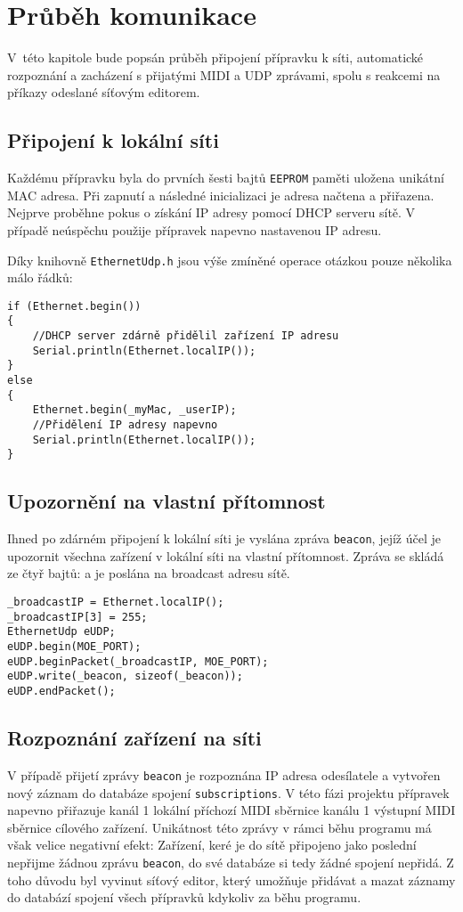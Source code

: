 \chapter{Průběh komunikace}
V~této kapitole bude popsán průběh připojení přípravku k síti, automatické rozpoznání a zacházení s přijatými \acs{MIDI} a \acs{UDP} zprávami, spolu s reakcemi na příkazy odeslané síťovým editorem.

\section{Připojení k lokální síti}
Každému přípravku byla do prvních šesti bajtů \texttt{EEPROM} paměti uložena unikátní MAC adresa. Při zapnutí a následné inicializaci je adresa načtena a přiřazena. Nejprve proběhne pokus o získání IP adresy pomocí DHCP serveru sítě. V případě neúspěchu použije přípravek napevno nastavenou IP adresu. 

Díky knihovně \texttt{EthernetUdp.h} jsou výše zmíněné operace otázkou pouze několika málo řádků:

\begin{lstlisting}
if (Ethernet.begin())
{
    //DHCP server zdárně přidělil zařízení IP adresu
    Serial.println(Ethernet.localIP());
}
else
{
    Ethernet.begin(_myMac, _userIP);
    //Přidělení IP adresy napevno
    Serial.println(Ethernet.localIP());
}
\end{lstlisting}






\section{Upozornění na vlastní přítomnost}
Ihned po zdárném připojení k lokální síti je vyslána zpráva  \texttt{beacon}, jejíž účel je upozornit všechna zařízení v lokální síti na vlastní přítomnost. Zpráva se skládá ze čtyř bajtů:
a je poslána na broadcast adresu sítě.

\begin{lstlisting}
_broadcastIP = Ethernet.localIP();
_broadcastIP[3] = 255;
EthernetUdp eUDP;
eUDP.begin(MOE_PORT);
eUDP.beginPacket(_broadcastIP, MOE_PORT);
eUDP.write(_beacon, sizeof(_beacon));
eUDP.endPacket();
\end{lstlisting}

\section{Rozpoznání zařízení na síti}
V případě přijetí zprávy \texttt{beacon} je rozpoznána IP adresa odesílatele a vytvořen nový záznam do databáze spojení \texttt{sub\-scrip\-tions}. V této fázi projektu přípravek napevno přiřazuje kanál 1  lokální příchozí \acs{MIDI} sběrnice kanálu 1 výstupní \acs{MIDI} sběrnice cílového zařízení. Unikátnost této zprávy v rámci běhu programu má však velice negativní efekt: Zařízení, keré je do sítě připojeno jako poslední nepřijme žádnou zprávu \texttt{beacon}, do své databáze si tedy žádné spojení nepřidá. Z toho důvodu byl vyvinut síťový editor, který umožňuje přidávat a mazat záznamy do databází spojení všech přípravků kdykoliv za běhu programu. 


